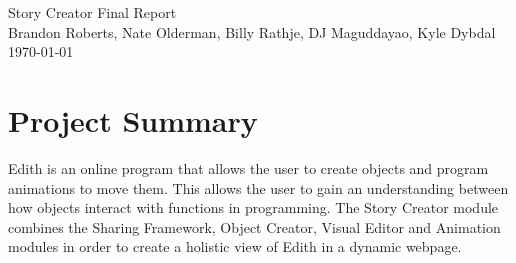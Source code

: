 \documentclass[12pt]{article}
\begin{document}

\begin{titlepage}
        \vspace*{\fill} %
        \begin{center}
                {\Huge Story Creator Final Report}\\ [0.5cm]        
                
                {\Large Brandon Roberts, Nate Olderman, Billy Rathje, DJ Maguddayao, Kyle Dybdal}\\[0.4cm]
                \today %
        \end{center}
        \vspace*{\fill}
\end{titlepage}

\section{Project Summary}
Edith is an online program that allows the user to create objects and program animations to move them.  This allows the user to gain an understanding between how objects interact with functions in programming.  The Story Creator module combines the Sharing Framework, Object Creator, Visual Editor and Animation modules in order to create a holistic view of Edith in a dynamic webpage. \\
\end{document}
